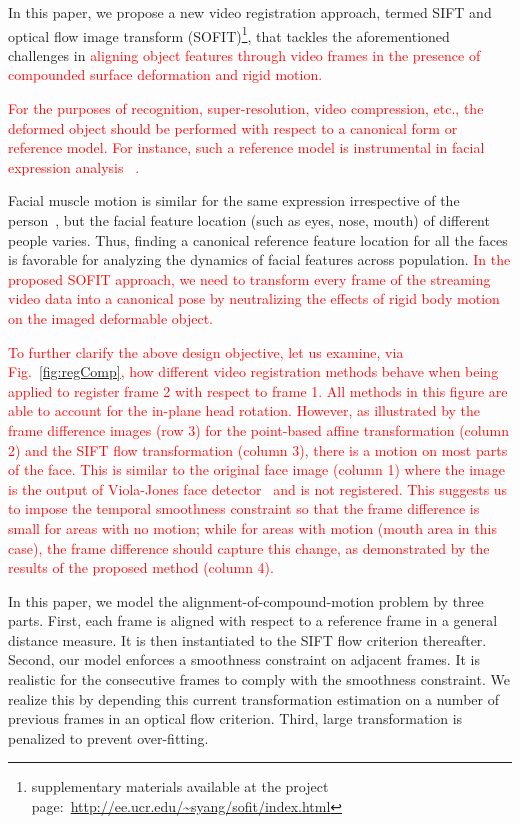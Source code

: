 \documentclass[10pt,journal]{IEEEtran}
\newcommand{\Songfan}[1]{\textcolor{red}{#1}}
\begin{document}
In this paper, we propose a new video registration approach, termed SIFT and optical flow image transform (SOFIT)\footnote{supplementary materials available at the project page:~\url{http://ee.ucr.edu/~syang/sofit/index.html}}, that tackles the aforementioned challenges in \Songfan{aligning object features through video frames in the presence of compounded surface deformation and rigid motion.}

\Songfan{
For the purposes of recognition, super-resolution, video compression, etc., the deformed object should be performed with respect to a canonical form or reference model.
For instance, such a reference model is instrumental in facial expression analysis ~\cite{Yang_SMCB12}.
}

Facial muscle motion is similar for the same expression irrespective of the person~\cite{Ekman78}, but the facial feature location (such as eyes, nose, mouth) of different people varies. Thus, finding a canonical reference feature location for all the faces is favorable for analyzing the dynamics of facial features across population. \Songfan{In the proposed SOFIT approach, we need to transform every frame of the streaming video data into a canonical pose by neutralizing the effects of rigid body motion on the imaged deformable object.}

\Songfan{To further clarify the above design objective, let us examine, via Fig.~\ref{fig:regComp}, how different video registration methods behave when being applied to register frame 2 with respect to frame 1.  All methods in this figure are able to account for the in-plane head rotation. However, as illustrated by the frame difference images (row 3) for the point-based affine transformation (column 2) and the SIFT flow transformation (column 3), there is a motion on most parts of the face. This is similar to the original face image (column 1) where the image is the output of Viola-Jones face detector~\cite{Viola_IJCV04} and is not registered. This suggests us to impose the temporal smoothness constraint so that the frame difference is small for areas with no motion; while for areas with motion (mouth area in this case), the frame difference should capture this change, as demonstrated by the results of the proposed method (column 4).}

In this paper, we model the alignment-of-compound-motion problem by three parts. First, each frame is aligned with respect to a reference frame in a general distance measure. It is then instantiated to the SIFT flow criterion thereafter. Second, our model enforces a smoothness constraint on adjacent frames. It is realistic for the consecutive frames to comply with the smoothness constraint. We realize this by depending this current transformation estimation on a number of previous frames in an optical flow criterion. Third, large transformation is penalized to prevent over-fitting. 
\end{document}
